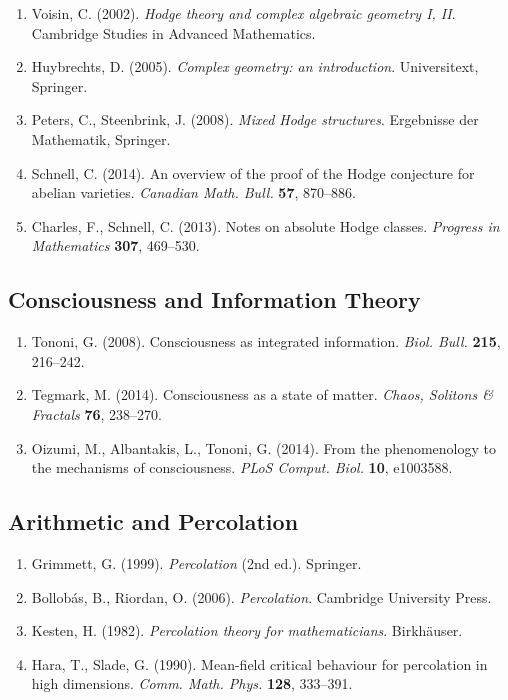\documentclass[11pt,a4paper]{article}
\theoremstyle{plain}
\theoremstyle{definition}
\theoremstyle{remark}
\begin{document}
\begin{enumerate}
\item Voisin, C. (2002). \emph{Hodge theory and complex algebraic geometry I, II}. Cambridge Studies in Advanced Mathematics.

\item Huybrechts, D. (2005). \emph{Complex geometry: an introduction}. Universitext, Springer.

\item Peters, C., Steenbrink, J. (2008). \emph{Mixed Hodge structures}. Ergebnisse der Mathematik, Springer.

\item Schnell, C. (2014). An overview of the proof of the Hodge conjecture for abelian varieties. \emph{Canadian Math. Bull.} \textbf{57}, 870--886.

\item Charles, F., Schnell, C. (2013). Notes on absolute Hodge classes. \emph{Progress in Mathematics} \textbf{307}, 469--530.
\end{enumerate}

\subsection{Consciousness and Information Theory}

\begin{enumerate}
\item Tononi, G. (2008). Consciousness as integrated information. \emph{Biol. Bull.} \textbf{215}, 216--242.

\item Tegmark, M. (2014). Consciousness as a state of matter. \emph{Chaos, Solitons \& Fractals} \textbf{76}, 238--270.

\item Oizumi, M., Albantakis, L., Tononi, G. (2014). From the phenomenology to the mechanisms of consciousness. \emph{PLoS Comput. Biol.} \textbf{10}, e1003588.
\end{enumerate}

\subsection{Arithmetic and Percolation}

\begin{enumerate}
\item Grimmett, G. (1999). \emph{Percolation} (2nd ed.). Springer.

\item Bollobás, B., Riordan, O. (2006). \emph{Percolation}. Cambridge University Press.

\item Kesten, H. (1982). \emph{Percolation theory for mathematicians}. Birkhäuser.

\item Hara, T., Slade, G. (1990). Mean-field critical behaviour for percolation in high dimensions. \emph{Comm. Math. Phys.} \textbf{128}, 333--391.
\end{enumerate}

\printindex
\end{document}
